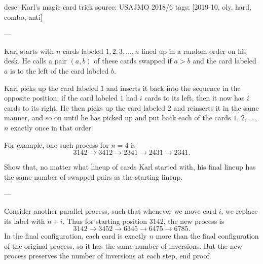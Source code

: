 desc: Karl's magic card trick
source: USAJMO 2018/6
tags: [2019-10, oly, hard, combo, anti]

---

Karl starts with $n$ cards labeled $1,2,3,\ldots,n$ lined up in a random order on his desk. He calls a pair $(a,b)$ of these cards swapped if $a>b$ and the card labeled $a$ is to the left of the card labeled $b$.

Karl picks up the card labeled $1$ and inserts it back into the sequence in the opposite position: if the card labeled $1$ had $i$ cards to its left, then it now has $i$ cards to its right. He then picks up the card labeled $2$ and reinserts it in the same manner, and so on until he has picked up and put back each of the cards $1$, $2$, $\ldots$, $n$ exactly once in that order.

For example, one such process for $n=4$ is \[3142\to3412\to2341\to2431\to2341.\]

Show that, no matter what lineup of cards Karl started with, his final lineup has the same number of swapped pairs as the starting lineup.

---

Consider another parallel process, such that whenever we move card $i$, we replace its label with $n+i$. Thus for starting position $3142$, the new process is \[3142\to3452\to6345\to6475\to6785.\]
In the final configuration, each card is exactly $n$ more than the final configuration of the original process, so it has the same number of inversions. But the new process preserves the number of inversions at each step, end proof.

